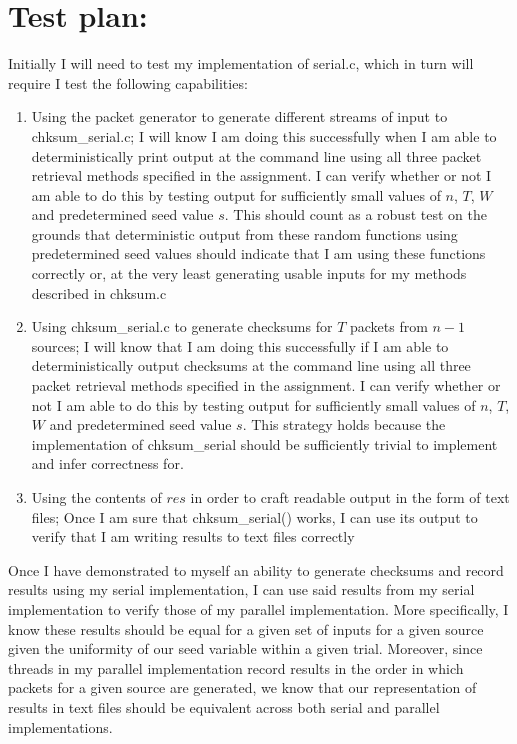 \documentclass[]{article}
\begin{document}
\section{Test plan:} 
Initially I will need to test my implementation of serial.c, which in turn will require I test the following capabilities:
\begin{enumerate}
	\item Using the packet generator to generate different streams of input to chksum\_serial.c; I will know I am doing this successfully when I am able to deterministically print output at the command line using all three packet retrieval methods specified in the assignment. I can verify whether or not I am able to do this by testing output for sufficiently small values of $n$, $T$, $W$ and predetermined seed value $s$.
	This should count as a robust test on the grounds that deterministic output from these random functions using predetermined seed values should indicate that I am using these functions correctly or, at the very least generating usable inputs for my methods described in chksum.c
	\item Using chksum\_serial.c to generate checksums for $T$ packets from $n - 1$ sources; I will know that I am doing this successfully if I am able to deterministically output checksums at the command line using all three packet retrieval methods specified in the assignment. I can verify whether or not I am able to do this by testing output for sufficiently small values of $n$, $T$, $W$ and predetermined seed value $s$. This strategy holds because the implementation of chksum\_serial should be sufficiently trivial to implement and infer correctness for.
	\item Using the contents of $res$ in order to craft readable output in the form of text files; Once I am sure that chksum\_serial() works, I can use its output to verify that I am writing results to text files correctly
\end{enumerate}
Once I have demonstrated to myself an ability to generate checksums and record results using my serial implementation, I can use said results from my serial implementation to verify those of my parallel implementation. More specifically, I know these results should be equal for a given set of inputs for a given source given the uniformity of our seed variable within a given trial. Moreover, since threads in my parallel implementation record results in the order in which packets for a given source are generated, we know that our representation of results in text files should be equivalent across both serial and parallel implementations.
\end{document}
